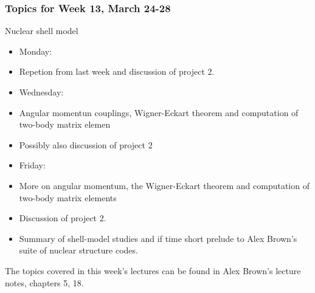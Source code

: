 \documentclass[compress]{beamer}
\begin{document}
\frame
{
  \frametitle{Topics for Week 13, March 24-28}
  \begin{block}{Nuclear shell model}
\begin{itemize}
\item Monday:
\item Repetion from last week and discussion of project 2.
\item Wednesday:
\item Angular momentun couplings, Wigner-Eckart theorem and computation of two-body matrix elemen
\item Possibly also discussion of project 2
\item Friday:
\item More on angular momentum, the Wigner-Eckart theorem and computation of two-body matrix elements
\item Discussion of project 2.
\item Summary of shell-model studies and if time short prelude to Alex Brown's suite of nuclear structure  codes. 
\end{itemize}
The topics covered in this week's lectures can be found in Alex Brown's lecture notes, chapters 5, 18.

  \end{block}
} 



\end{document}
